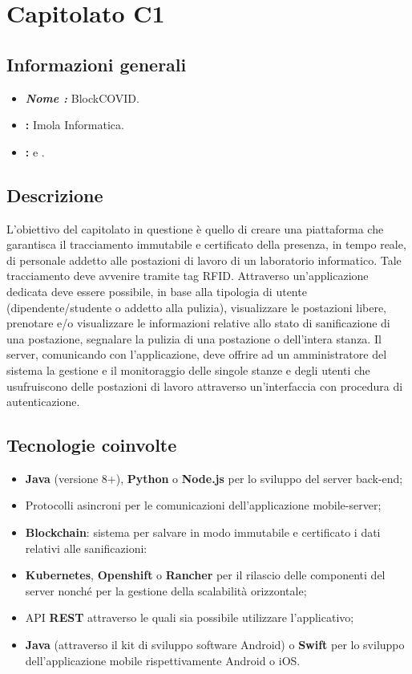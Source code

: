 \section{Capitolato C1}

\subsection{Informazioni generali}{
\begin{itemize}
\item \textbf{\emph{Nome :}} BlockCOVID.
\item \textbf{\commitProg:} Imola Informatica.
\item \textbf{\proponProg:} \VT{} e \CR.
\end{itemize}
}

\subsection{Descrizione}{
L'obiettivo del capitolato in questione è quello di creare una piattaforma che garantisca il tracciamento immutabile e certificato della presenza, in tempo reale, di personale addetto alle postazioni di lavoro di un laboratorio informatico. Tale tracciamento deve avvenire tramite tag RFID. Attraverso un'applicazione dedicata deve essere possibile, in base alla tipologia di utente (dipendente/studente o addetto alla pulizia), visualizzare le postazioni libere, prenotare e/o visualizzare le informazioni relative allo stato di sanificazione di una postazione, segnalare la pulizia di una postazione o dell'intera stanza. Il server, comunicando con l'applicazione, deve offrire ad un amministratore del sistema la gestione e il monitoraggio delle singole stanze e degli utenti che usufruiscono delle postazioni di lavoro attraverso un'interfaccia con procedura di autenticazione.

}

\subsection{Tecnologie coinvolte}{
\begin{itemize}
\item \textbf{Java} (versione 8+), \textbf{Python} o \textbf{Node.js} per lo sviluppo del server back-end;
\item Protocolli asincroni per le comunicazioni dell'applicazione mobile-server;
\item \textbf{Blockchain}: sistema per salvare in modo immutabile e certificato i dati relativi alle sanificazioni:
\item \textbf{Kubernetes}, \textbf{Openshift} o \textbf{Rancher} per il rilascio delle componenti
del server nonché per la gestione della scalabilità orizzontale;
\item API \textbf{REST} attraverso le quali sia possibile utilizzare l'applicativo;
\item \textbf{Java} (attraverso il kit di sviluppo software Android) o \textbf{Swift} per lo sviluppo dell'applicazione mobile rispettivamente Android o iOS.
\end{itemize}
}

